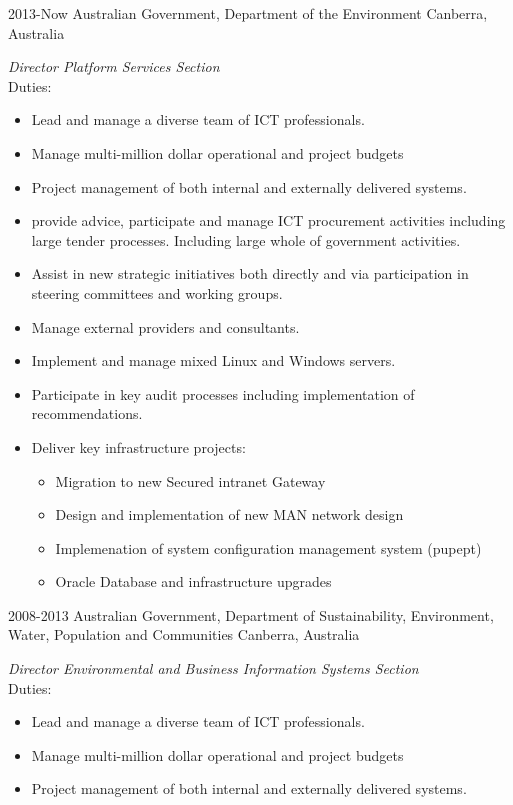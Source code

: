 \documentclass[]{friggeri-cv} %
\begin{document}
\begin{entrylist}
\entry
{2013-Now}
{Australian Government, Department of the Environment}
{Canberra, Australia}
{\emph{Director Platform Services Section} \\
Duties:
\begin{itemize}
\item Lead and manage a diverse team of ICT professionals.
\item Manage multi-million dollar operational and project budgets
\item Project management of both internal and externally delivered systems.
\item provide advice, participate and manage ICT procurement activities including large tender processes. Including large whole of government activities.
\item Assist in new strategic initiatives both directly and via participation in steering committees and working groups.
\item Manage external providers and consultants.
\item Implement and manage mixed Linux and Windows servers.
\item Participate in key audit processes including implementation of recommendations.
\item Deliver key infrastructure projects:
\begin{itemize}
\item Migration to new Secured intranet Gateway
\item Design and implementation of new MAN network design
\item Implemenation of system configuration management system (pupept)
\item Oracle Database and infrastructure upgrades
\end{itemize}
\end{itemize}}
\entry
{2008-2013}
{Australian Government, Department of Sustainability, Environment, Water, Population and Communities}
{Canberra, Australia}
{\emph{Director Environmental and Business Information Systems Section} \\
Duties:
\begin{itemize}
\item Lead and manage a diverse team of ICT professionals.
\item Manage multi-million dollar operational and project budgets
\item Project management of both internal and externally delivered systems.

\end{itemize}}
\end{entrylist}
\end{document}
